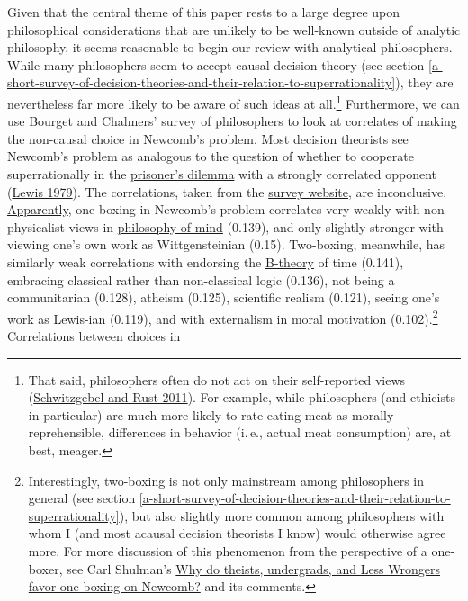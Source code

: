 Given that the central theme of this paper rests to a large degree upon
philosophical considerations that are unlikely to be well-known outside
of analytic philosophy, it seems reasonable to begin our review with
analytical philosophers. While many philosophers seem to accept causal
decision theory (see section
\ref{a-short-survey-of-decision-theories-and-their-relation-to-superrationality}), they are nevertheless far more likely to be aware
of such ideas at all.\footnote{That said, philosophers often do not act
  on their self-reported views
  (\href{http://www.faculty.ucr.edu/~eschwitz/SchwitzAbs/EthSelfRep.htm}{Schwitzgebel
  and Rust 2011}). For example, while philosophers (and ethicists in
  particular) are much more likely to rate eating meat as morally
  reprehensible, differences in behavior (i.\,e., actual meat consumption)
  are, at best, meager.} Furthermore, we can use Bourget and Chalmers' \citeyear{Bourget2014-fm}
survey of
philosophers to look at correlates of making the non-causal choice in
Newcomb's problem. Most decision theorists see Newcomb's problem as
analogous to the question of whether to cooperate superrationally in the
\href{https://en.wikipedia.org/wiki/Prisoner\%27s_dilemma}{prisoner's
dilemma} with a strongly correlated opponent
(\href{https://sl4librarian.files.wordpress.com/2017/01/lewis-prisoners-dilemma-newcomb-problem.pdf}{Lewis
1979}). The correlations, taken from the
\href{http://philpapers.org/surveys}{survey website}, are
inconclusive.
\href{http://philpapers.org/surveys/linear_most.pl}{Apparently},
one-boxing in Newcomb's problem correlates very weakly with
non-physicalist views in
\href{https://en.wikipedia.org/wiki/Philosophy_of_mind}{philosophy
of mind} (0.139), and only slightly stronger with viewing one's own
work as Wittgensteinian (0.15). Two-boxing, meanwhile, has similarly
weak correlations with endorsing the
\href{https://en.wikipedia.org/wiki/B-theory_of_time}{B-theory}
of time (0.141), embracing classical rather than non-classical logic
(0.136), not being a communitarian (0.128), atheism (0.125), scientific
realism (0.121), seeing one's work as Lewis-ian (0.119), and with
externalism in moral motivation (0.102).\footnote{Interestingly,
  two-boxing is not only mainstream among philosophers in general (see
  section
  \ref{a-short-survey-of-decision-theories-and-their-relation-to-superrationality}), but also slightly more common among
  philosophers with whom I (and most acausal decision theorists I know)
  would otherwise agree more. For more discussion of this phenomenon
  from the perspective of a one-boxer, see Carl Shulman's
  \href{http://lesswrong.com/lw/hqs/why_do_theists_undergrads_and_less_wrongers_favor/}{Why
  do theists, undergrads, and Less Wrongers favor one-boxing on
  Newcomb?} and its comments.} Correlations between choices in
